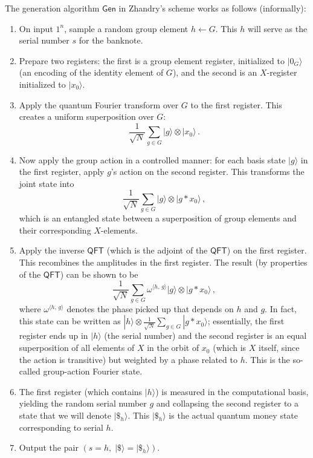 \documentclass[12pt]{report}
\newcommand{\qft}{\mathsf{QFT}}
\begin{document}
The generation algorithm $\mathsf{Gen}$ in Zhandry’s scheme works as follows (informally):
\begin{enumerate}
    \item On input $1^n$, sample a random group element $h \leftarrow G$. This $h$ will serve as the serial number $s$ for the banknote.
    \item Prepare two registers: the first is a group element register, initialized to $|0_G\rangle$ (an encoding of the identity element of $G$), and the second is an $X$-register initialized to $|x_0\rangle$.
    \item Apply the quantum Fourier transform over $G$ to the first register. This creates a uniform superposition over $G$: 
    \[
    \frac{1}{\sqrt{N}} \sum_{g \in G} |g\rangle \otimes |x_0\rangle\,.
    \] 
    \item Now apply the group action in a controlled manner: for each basis state $|g\rangle$ in the first register, apply $g$’s action on the second register. This transforms the joint state into 
    \[
    \frac{1}{\sqrt{N}} \sum_{g \in G} |g\rangle \otimes |g * x_0\rangle\,,
    \] 
    which is an entangled state between a superposition of group elements and their corresponding $X$-elements.
    \item Apply the inverse $\qft$ (which is the adjoint of the $\qft$) on the first register. This recombines the amplitudes in the first register. The result (by properties of the $\qft$) can be shown to be 
    \[
    \frac{1}{\sqrt{N}} \sum_{g \in G} \omega^{\langle h,\,g \rangle} |g\rangle \otimes |g * x_0\rangle\,,
    \] 
    where $\omega^{\langle h,\,g \rangle}$ denotes the phase picked up that depends on $h$ and $g$. In fact, this state can be written as $|h\rangle \otimes \frac{1}{\sqrt{N}}\sum_{g \in G} |g * x_0\rangle$; essentially, the first register ends up in $|h\rangle$ (the serial number) and the second register is an equal superposition of all elements of $X$ in the orbit of $x_0$ (which is $X$ itself, since the action is transitive) but weighted by a phase related to $h$. This is the so-called group-action Fourier state.
    \item The first register (which contains $|h\rangle$) is measured in the computational basis, yielding the random serial number $g$ and collapsing the second register to a state that we will denote $|\$_h\rangle$. This $|\$_h\rangle$ is the actual quantum money state corresponding to serial $h$.
    \item Output the pair $(s = h,\; |\$\rangle = |\$_h\rangle)$.
\end{enumerate}
\end{document}
